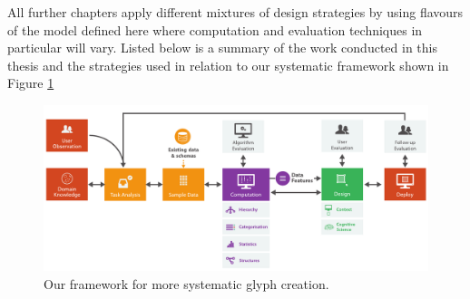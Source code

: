 All further chapters apply different mixtures of design strategies by using flavours of the model defined here where computation and evaluation techniques in particular will vary.
Listed below is a summary of the work conducted in this thesis and the strategies used in relation to our systematic framework shown in Figure \ref{fig:strategies_examples}

\begin{figure}[b!]
\centering
\includegraphics[width=\textwidth]{images/ch3/model_horizontal_new}
\caption{Our framework for more systematic glyph creation.}
\label{fig:strategies_examples}
\end{figure}


